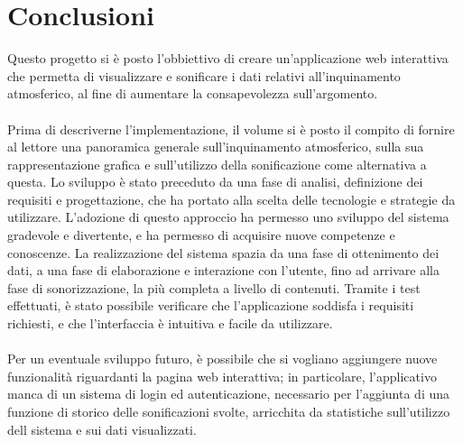 \clearpage{\pagestyle{empty}\cleardoublepage}
\chapter*{Conclusioni}
Questo progetto si è posto l'obbiettivo di creare un'applicazione web interattiva che permetta di visualizzare e sonificare i dati relativi all'inquinamento atmosferico, al fine di aumentare la consapevolezza sull'argomento.
\\\\
Prima di descriverne l'implementazione, il volume si è posto il compito di fornire al lettore una panoramica generale sull'inquinamento atmosferico, sulla sua rappresentazione grafica e sull'utilizzo della sonificazione come alternativa a questa.
Lo sviluppo è stato preceduto da una fase di analisi, definizione dei requisiti e progettazione, che ha portato alla scelta delle tecnologie e strategie da utilizzare.
L'adozione di questo approccio ha permesso uno sviluppo del sistema gradevole e divertente, e ha permesso di acquisire nuove competenze e conoscenze.
La realizzazione del sistema spazia da una fase di ottenimento dei dati, a una fase di elaborazione e interazione con l'utente, fino ad arrivare alla fase di sonorizzazione, la più completa a livello di contenuti.
Tramite i test effettuati, è stato possibile verificare che l'applicazione soddisfa i requisiti richiesti, e che l'interfaccia è intuitiva e facile da utilizzare.
\\\\
Per un eventuale sviluppo futuro, è possibile che si vogliano aggiungere nuove funzionalità riguardanti la pagina web interattiva; in particolare, l'applicativo manca di un sistema di login ed autenticazione,
necessario per l'aggiunta di una funzione di storico delle sonificazioni svolte, arricchita da statistiche sull'utilizzo dell sistema e sui dati visualizzati.

